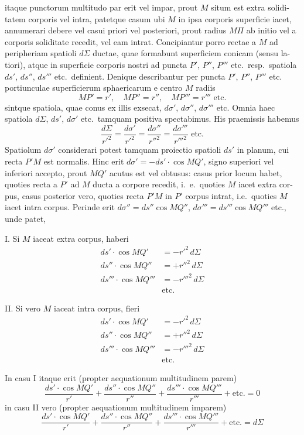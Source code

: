 \documentclass[12pt,a4paper]{article}
\theoremstyle{gauss}
\begin{document}
\newpage
\setcounter{page}{16}

itaque punctorum multitudo par erit vel impar, prout $M$ situm est extra solidi-
tatem corporis vel intra, patetque casum ubi $M$ in ipsa corporis superficie iacet,
annumerari debere vel casui priori vel posteriori, prout radius $M\Pi$ ab initio vel
a corporis soliditate recedit, vel eam intrat. Concipiantur porro rectae a $M$ ad
peripheriam spatioli $d\Sigma$ ductae, quae formabunt superficiem conicam (sensu la-
tiori), atque in superficie corporis nostri ad puncta $P'$, $P''$, $P'''$ etc.~resp.~spatiola
$ds'$, $ds''$, $ds'''$ etc.~definient. Denique describantur per puncta $P'$, $P''$, $P'''$ etc.
portiunculae superficierum sphaericarum e centro $M$ radiis
\[
MP'=r',\quad MP''=r'',\quad MP'''=r''' \text{ etc.}
\]
sintque spatiola, quae conus ex illis exsecat, $d\sigma'$, $d\sigma''$, $d\sigma'''$ etc. Omnia haec
spatiola $d\Sigma$, $ds'$, $d\sigma'$ etc.~tamquam positiva spectabimus. His praemissis habemus
\[
\frac{d\Sigma}{r'^2} = \frac{d\sigma'}{r'^2} = \frac{d\sigma''}{r''^2} = \frac{d\sigma'''}{r'''^2} \text{ etc.}
\]
Spatiolum $d\sigma'$ considerari potest tamquam proiectio spatioli $ds'$ in planum, cui
recta $P'M$ est normalis. Hinc erit $d\sigma' = -ds'\cdot\cos MQ'$, signo superiori vel
inferiori accepto, prout $MQ'$ acutus est vel obtusus: casus prior locum habet,
quoties recta a $P'$ ad $M$ ducta a corpore recedit, i.~e.~quoties $M$ iacet extra cor-
pus, casus posterior vero, quoties recta $P'M$ in $P'$ corpus intrat, i.e.~quoties $M$
iacet intra corpus. Perinde erit $d\sigma'' = ds''\cos MQ''$, $d\sigma''' = ds'''\cos MQ'''$ etc.,
unde patet,

I. Si $M$ iaceat extra corpus, haberi
\begin{align*}
ds'\cdot\cos MQ' &= -r'^2\,d\Sigma \\
ds''\cdot\cos MQ'' &= +r''^2\,d\Sigma \\
ds'''\cdot\cos MQ''' &= -r'''^2\,d\Sigma \\
&\text{etc.}
\end{align*}

II. Si vero $M$ iaceat intra corpus, fieri
\begin{align*}
ds'\cdot\cos MQ' &= -r'^2\,d\Sigma \\
ds''\cdot\cos MQ'' &= +r''^2\,d\Sigma \\
ds'''\cdot\cos MQ''' &= -r'''^2\,d\Sigma \\
&\text{etc.}
\end{align*}

In casu I itaque erit (propter aequationum multitudinem parem)
\[
\frac{ds'\cdot\cos MQ'}{r'} + \frac{ds''\cdot\cos MQ''}{r''} + \frac{ds'''\cdot\cos MQ'''}{r'''} + \text{etc.} = 0
\]
in casu II vero (propter aequationum multitudinem imparem)
\[
\frac{ds'\cdot\cos MQ'}{r'} + \frac{ds''\cdot\cos MQ''}{r''} + \frac{ds'''\cdot\cos MQ'''}{r'''} + \text{etc.} = d\Sigma
\]
\end{document}
